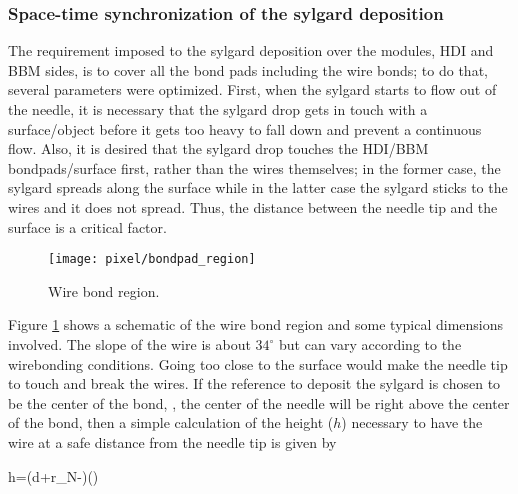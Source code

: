 \subsubsection*{Space-time synchronization of the sylgard deposition}

The requirement imposed to the sylgard deposition over the modules, HDI and BBM sides, is to cover all the bond pads including the wire bonds; to do that, several parameters were optimized. First, when the sylgard starts to flow out of the needle, it is necessary that the sylgard drop gets in touch with a surface/object before it gets too heavy to fall down and prevent a continuous flow. Also, it is desired that the sylgard drop touches the HDI/BBM bondpads/surface first, rather than the wires themselves; in the former case, the sylgard spreads along the surface while in the latter case the sylgard sticks to the wires and it does not spread. Thus, the distance between the needle tip and the surface is a critical factor.

\begin{figure}[h]
  \begin{center}
    \texttt{[image: pixel/bondpad\_region]}
    \caption[Wire bond region.]{Wire bond region.}\label{fig:bondpad_region}
  \end{center}
\end{figure}

Figure \ref{fig:bondpad_region} shows a schematic of the wire bond region and some typical dimensions involved. The slope of the wire is about $34^\circ$ but can vary according to the wirebonding conditions. Going too close to the surface would make the needle tip to touch and break the wires. If the reference to deposit the sylgard is chosen to be the center of the bond, \ie, the center of the needle will be right above the center of the bond, then a simple calculation of the height ($h$) necessary to have the wire at a safe distance from the needle tip is given by 

\beqn
h=\left(d+r_N-\right )\tan(\theta)
\eeqn

